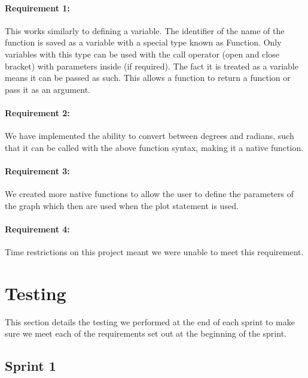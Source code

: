 \documentclass[a4paper, oneside, 11pt]{report}
\begin{document}
\subsubsection{Requirement 1:}
This works similarly to defining a variable. The identifier of the name of the function is saved as a variable with a special type known as Function. Only variables with this type can be used with the call operator (open and close bracket) with parameters inside (if required). The fact it is treated as a variable means it can be passed as such. This allows a function to return a function or pass it as an argument.

\subsubsection{Requirement 2:}
We have implemented the ability to convert between degrees and radians, such that it can be called with the above function syntax, making it a native function.

\subsubsection{Requirement 3:}
We created more native functions to allow the user to define the parameters of the graph which then are used when the plot statement is used.

\subsubsection{Requirement 4:}
Time restrictions on this project meant we were unable to meet this requirement.

\chapter{Testing}

This section details the testing we performed at the end of each sprint to make sure we meet each of the requirements set out at the beginning of the sprint.

\section{Sprint 1}
\end{document}

